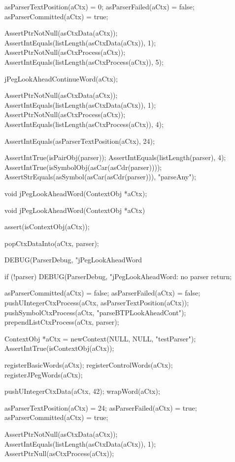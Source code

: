   asParserTextPosition(aCtx) = 0;
  asParserFailed(aCtx)       = false;
  asParserCommitted(aCtx)    = true;
  
  AssertPtrNotNull(asCtxData(aCtx));
  AssertIntEquals(listLength(asCtxData(aCtx)), 1);
  AssertPtrNotNull(asCtxProcess(aCtx));
  AssertIntEquals(listLength(asCtxProcess(aCtx)), 5);
    
  jPegLookAheadContinueWord(aCtx);
  
  AssertPtrNotNull(asCtxData(aCtx));
  AssertIntEquals(listLength(asCtxData(aCtx)), 1);
  AssertPtrNotNull(asCtxProcess(aCtx));
  AssertIntEquals(listLength(asCtxProcess(aCtx)), 4);
    
  AssertIntEquals(asParserTextPosition(aCtx), 24);
  
  AssertIntTrue(isPairObj(parser));
  AssertIntEquals(listLength(parser), 4);
  AssertIntTrue(isSymbolObj(asCar(asCdr(parser))));
  AssertStrEquals(asSymbol(asCar(asCdr(parser))), "parseAny");  
\stopCTest
\stopTestCase
\stopTestSuite

\startTestSuite[jPegNotWord]

\startCHeader
void jPegLookAheadWord(ContextObj *aCtx);
\stopCHeader

\startCCode
void jPegLookAheadWord(ContextObj *aCtx) {
  assert(isContextObj(aCtx));
  
  popCtxDataInto(aCtx, parser);
  
  DEBUG(ParserDebug, "jPegLookAheadWord%
  
  if (!parser) {
    DEBUG(ParserDebug, "jPegLookAheadWord: no parser%
    return;
  }

  asParserCommitted(aCtx) = false;
  asParserFailed(aCtx)    = false;
  pushUIntegerCtxProcess(aCtx, asParserTextPosition(aCtx));
  pushSymbolCtxProcess(aCtx, "parseBTPLookAheadCont");
  prependListCtxProcess(aCtx, parser);
}
\stopCCode

\startCTest
  ContextObj *aCtx = newContext(NULL, NULL, "testParser");
  AssertIntTrue(isContextObj(aCtx));
  
  registerBasicWords(aCtx);
  registerControlWords(aCtx);
  registerJPegWords(aCtx);
  
  pushUIntegerCtxData(aCtx, 42);
  wrapWord(aCtx);
  
  asParserTextPosition(aCtx) = 24;
  asParserFailed(aCtx)       = true;
  asParserCommitted(aCtx)    = true;
  
  AssertPtrNotNull(asCtxData(aCtx));
  AssertIntEquals(listLength(asCtxData(aCtx)), 1);
  AssertPtrNull(asCtxProcess(aCtx));
  
